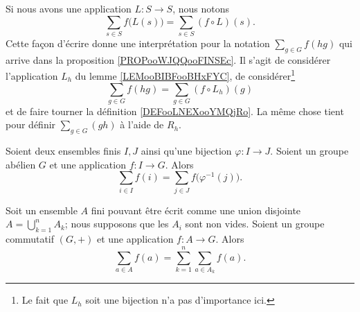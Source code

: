Si nous avons une application \( L\colon S\to S\), nous notons
\begin{equation}
	\sum_{s\in S}f\big( L(s) \big)=\sum_{s\in S}(f\circ L)(s).
\end{equation}
Cette façon d'écrire donne une interprétation pour la notation \( \sum_{g\in G}f(hg)\) qui arrive dans la proposition \ref{PROPooWJQQooFINSEc}. Il s'agit de considérer l'application \( L_h\) du lemme \ref{LEMooBIBFooBHxFYC}, de considérer\footnote{Le fait que \( L_h\) soit une bijection n'a pas d'importance ici.}
\begin{equation}        \label{EQooQQBEooFDOBVG}
	\sum_{g\in G}f(hg)=\sum_{g\in G}(f\circ L_h)(g)
\end{equation}
et de faire tourner la définition \ref{DEFooLNEXooYMQjRo}. La même chose tient pour définir \( \sum_{g\in G}(gh)\) à l'aide de \( R_h\).


\begin{lemma}		\label{LEMooGAMAooOAFhrc}
	Soient deux ensembles finis \( I,J\) ainsi qu'une bijection \(\varphi \colon I\to J  \). Soient un groupe abélien \( G\) et une application \(f \colon I\to G  \). Alors
	\begin{equation}
		\sum_{i\in I}f(i)=\sum_{j\in J}f\big( \varphi^{-1}(j) \big).
	\end{equation}
\end{lemma}

\begin{lemma}
	Soit un ensemble \( A\) fini pouvant être écrit comme une union disjointe \( A=\bigcup_{k=1}^nA_k\); nous supposons que les \( A_i\) sont non vides. Soient un groupe commutatif \( (G,+)\) et une application \( f\colon A\to G\). Alors
	\begin{equation}
		\sum_{a\in A}f(a)=\sum_{k=1}^n\sum_{a\in A_k}f(a).
	\end{equation}
\end{lemma}


